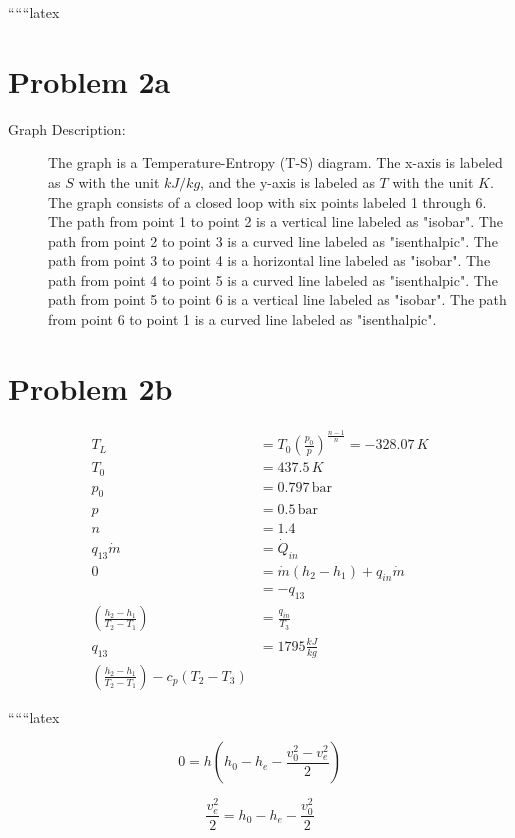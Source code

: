 
``````latex


\section*{Problem 2a}

\begin{description}
    \item[Graph Description:] The graph is a Temperature-Entropy (T-S) diagram. The x-axis is labeled as $S$ with the unit $kJ/kg$, and the y-axis is labeled as $T$ with the unit $K$. The graph consists of a closed loop with six points labeled 1 through 6. The path from point 1 to point 2 is a vertical line labeled as "isobar". The path from point 2 to point 3 is a curved line labeled as "isenthalpic". The path from point 3 to point 4 is a horizontal line labeled as "isobar". The path from point 4 to point 5 is a curved line labeled as "isenthalpic". The path from point 5 to point 6 is a vertical line labeled as "isobar". The path from point 6 to point 1 is a curved line labeled as "isenthalpic".
\end{description}

\section*{Problem 2b}

\begin{align*}
    T_L &= T_0 \left( \frac{p_0}{p} \right)^{\frac{n-1}{n}} = -328.07 \, K \\
    T_0 &= 437.5 \, K \\
    p_0 &= 0.797 \, \text{bar} \\
    p &= 0.5 \, \text{bar} \\
    n &= 1.4 \\
    q_{13} \dot{m} &= \dot{Q}_{in} \\
    0 &= \dot{m} (h_2 - h_1) + q_{in} \dot{m} \\
    &= -q_{13} \\
    \left( \frac{h_2 - h_1}{T_2 - T_1} \right) &= \frac{q_{in}}{T_3} \\
    q_{13} &= 1795 \frac{kJ}{kg} \\
    \left( \frac{h_2 - h_1}{T_2 - T_1} \right) - c_p (T_2 - T_3)
\end{align*}

``````latex


\[
0 = h \left( h_0 - h_e - \frac{v_0^2 - v_e^2}{2} \right)
\]

\[
\frac{v_e^2}{2} = h_0 - h_e - \frac{v_0^2}{2}
\]

